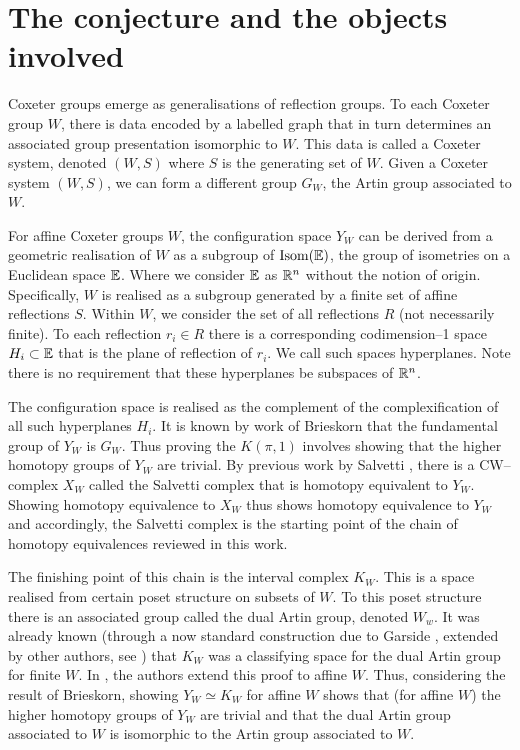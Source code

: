\documentclass[class=guthesis, crop=false]{standalone}
\begin{document}
\section{The conjecture and the objects involved}
Coxeter groups emerge as generalisations of reflection groups. To each Coxeter group $W$, there is data encoded by a labelled graph that in turn determines an associated group presentation isomorphic to $W$. This data is called a Coxeter system, denoted $(W,S)$ where $S$ is the generating set of $W$. Given a Coxeter system $(W,S)$, we can form a different group $G_W$, the Artin group associated to $W$.

For affine Coxeter groups $W$, the configuration space $Y_W$ can be derived from a geometric realisation of $W$ as a subgroup of $\operatorname{Isom}(\mathbb{E})$, the group of isometries on a Euclidean space $\mathbb{E}$. Where we consider $\mathbb{E}$ as $\mathbb{R}^n$ without the notion of origin. Specifically, $W$ is realised as a subgroup generated by a finite set of affine reflections $S$. Within $W$, we consider the set of all reflections $R$ (not necessarily finite). To each reflection $r_i \in R$ there is a corresponding codimension--1 space $H_i \subset \mathbb{E}$ that is the plane of reflection of $r_i$. We call such spaces hyperplanes. Note there is no requirement that these hyperplanes be subspaces of $\mathbb{R}^n$.

The configuration space is realised as the complement of the complexification of all such hyperplanes $H_i$. It is known by work of Brieskorn \cite{brieskorn_fundamentalgruppe_1971} that the fundamental group of $Y_W$ is $G_W$. Thus proving the $K(\pi,1)$ involves showing that the higher homotopy groups of $Y_W$ are trivial. By previous work by Salvetti \cite{salvetti_topology_1987,salvetti_homotopy_1994}, there is a CW--complex $X_W$ called the Salvetti complex that is homotopy equivalent to $Y_W$. Showing homotopy equivalence to $X_W$ thus shows homotopy equivalence to $Y_W$ and accordingly, the Salvetti complex is the starting point of the chain of homotopy equivalences reviewed in this work.

The finishing point of this chain is the interval complex $K_W$. This is a space realised from certain poset structure on subsets of $W$. To this poset structure there is an associated group called the dual Artin group, denoted $W_w$. It was already known (through a now standard construction due to Garside \cite{garside_braid_1969}, extended by other authors, see \cite{charney_etal_bestvina_2002}) that $K_W$ was a classifying space for the dual Artin group for finite $W$. In \cite{paolini_salvetti_kpi1_2021}, the authors extend this proof to affine $W$. Thus, considering the result of Brieskorn, showing $Y_W \simeq K_W$ for affine $W$ shows that (for affine $W$) the higher homotopy groups of $Y_W$ are trivial and that the dual Artin group associated to $W$ is isomorphic to the Artin group associated to $W$.
\end{document}
